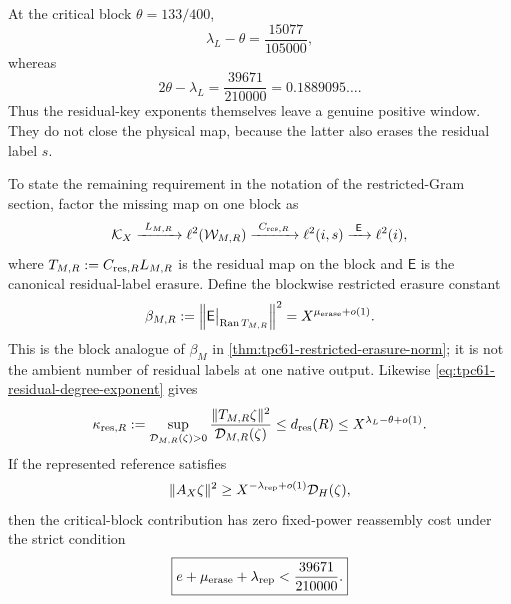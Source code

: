 At the critical block \(\theta=133/400\),
\begin{equation}
 \lambda_L-\theta
 =\frac{15077}{105000},
 \label{eq:tpc61-critical-residual-degree}
\end{equation}
whereas
\begin{equation}
 \boxed{
 2\theta-\lambda_L
 =\frac{39671}{210000}
 =0.1889095\ldots.}
 \label{eq:tpc61-residual-wedge}
\end{equation}
Thus the residual-key exponents themselves leave a genuine positive
window.  They do not close the physical map, because the latter also
erases the residual label \(s\).

To state the remaining requirement in the notation of the restricted-Gram
section, factor the missing map on one block as
\begin{equation}
 \mathcal K_X
 \xrightarrow{\ L_{M,R}\ }
 \ell^2(\mathcal W_{M,R})
 \xrightarrow{\ C_{{\rm res},R}\ }
 \ell^2(i,s)
 \xrightarrow{\ \mathsf E\ }
 \ell^2(i),
 \label{eq:tpc61-two-stage-missing-map}
\end{equation}
where \(T_{M,R}:=C_{{\rm res},R}L_{M,R}\) is the residual map on the block and
\(\mathsf E\) is the canonical residual-label erasure.  Define the
blockwise restricted erasure constant
\begin{equation}
 \beta_{M,R}
 :=\left\|
 \mathsf E\big|_{\operatorname{Ran} T_{M,R}}
 \right\|^2
 =X^{\mu_{\rm erase}+o(1)}.
 \label{eq:tpc61-restricted-erasure-exponent}
\end{equation}
This is the block analogue of \(\beta_M\) in
\cref{thm:tpc61-restricted-erasure-norm}; it is not the ambient number of
residual labels at one native output.  Likewise
\eqref{eq:tpc61-residual-degree-exponent} gives
\begin{equation}
 \kappa_{{\rm res},R}
 :=\sup_{\mathcal D_{M,R}(\zeta)>0}
   \frac{\|T_{M,R}\zeta\|^2}{\mathcal D_{M,R}(\zeta)}
 \le d_{\rm res}(R)
 \le X^{\lambda_L-\theta+o(1)}.
 \label{eq:tpc61-block-residual-kappa}
\end{equation}
If the represented reference satisfies
\begin{equation}
 \|A_X\zeta\|^2
 \ge X^{-\lambda_{\rm rep}+o(1)}\mathcal D_H(\zeta),
 \label{eq:tpc61-represented-reference-loss}
\end{equation}
then the critical-block contribution has zero fixed-power reassembly cost
under the strict condition
\begin{equation}
 \boxed{
 e+\mu_{\rm erase}+\lambda_{\rm rep}
 <\frac{39671}{210000}.}
 \label{eq:tpc61-critical-residual-route-condition}
\end{equation}
